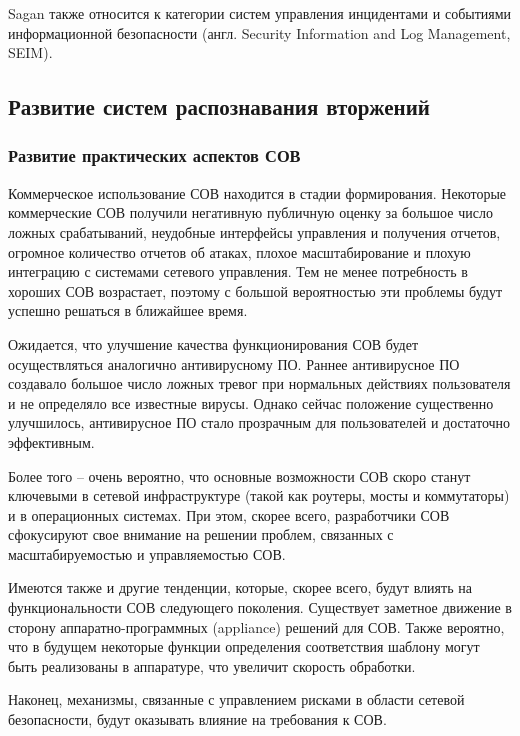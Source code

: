 Sagan также относится к категории систем управления инцидентами и событиями информационной 
безопасности (англ. Security Information and Log Management, SEIM).



\subsection{Развитие систем распознавания вторжений}

\subsubsection{Развитие практических аспектов СОВ}

Коммерческое использование СОВ находится в стадии формирования. Некоторые коммерческие 
СОВ получили негативную публичную оценку за большое число ложных срабатываний, неудобные 
интерфейсы управления и получения отчетов, огромное количество отчетов об атаках, 
плохое масштабирование и плохую интеграцию с системами сетевого управления. Тем не менее 
потребность в хороших СОВ возрастает, поэтому с большой вероятностью эти проблемы будут 
успешно решаться в ближайшее время.

Ожидается, что улучшение качества функционирования СОВ будет осуществляться аналогично 
антивирусному ПО. Раннее антивирусное ПО создавало большое число ложных тревог при 
нормальных действиях пользователя и не определяло все известные вирусы. Однако сейчас 
положение существенно улучшилось, антивирусное ПО стало прозрачным для пользователей 
и достаточно эффективным.

Более того – очень вероятно, что основные возможности СОВ скоро станут ключевыми в 
сетевой инфраструктуре (такой как роутеры, мосты и коммутаторы) и в операционных системах. 
При этом, скорее всего, разработчики СОВ сфокусируют свое внимание на решении проблем, 
связанных с масштабируемостью и управляемостью СОВ.

Имеются также и другие тенденции, которые, скорее всего, будут влиять на функциональности 
СОВ следующего поколения. Существует заметное движение в сторону аппаратно-программных 
(appliance) решений для СОВ. Также вероятно, что в будущем некоторые функции определения 
соответствия шаблону могут быть реализованы в аппаратуре, что увеличит скорость обработки.

Наконец, механизмы, связанные с управлением рисками в области сетевой безопасности, 
будут оказывать влияние на требования к СОВ.



